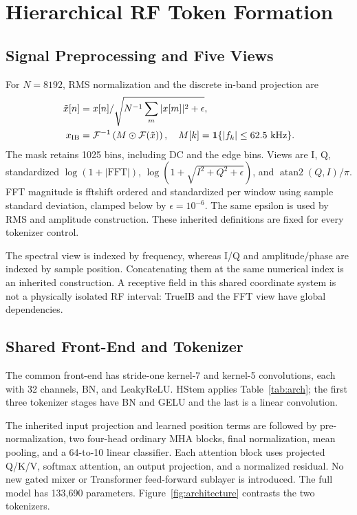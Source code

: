 \documentclass[journal]{IEEEtran}
\begin{document}
\section{Hierarchical RF Token Formation}
\subsection{Signal Preprocessing and Five Views}
For $N=8192$, RMS normalization and the discrete in-band projection are
\begin{align}
 \tilde{x}[n]&=x[n]/\sqrt{N^{-1}\sum_m|x[m]|^2+\epsilon},\\
 x_{\mathrm{IB}}&=\mathcal{F}^{-1}
      \left(M\odot\mathcal{F}(\tilde{x})\right),\quad
 M[k]=\mathbf{1}\{|f_k|\leq 62.5\ {\rm kHz}\}.
\end{align}
The mask retains 1025 bins, including DC and the edge bins. Views are I, Q, standardized $\log(1+|\mathrm{FFT}|)$, $\log(1+\sqrt{I^2+Q^2+\epsilon})$, and $\operatorname{atan2}(Q,I)/\pi$. FFT magnitude is fftshift ordered and standardized per window using sample standard deviation, clamped below by $\epsilon=10^{-6}$. The same epsilon is used by RMS and amplitude construction. These inherited definitions are fixed for every tokenizer control.

The spectral view is indexed by frequency, whereas I/Q and amplitude/phase are indexed by sample position. Concatenating them at the same numerical index is an inherited construction. A receptive field in this shared coordinate system is not a physically isolated RF interval: TrueIB and the FFT view have global dependencies.

\subsection{Shared Front-End and Tokenizer}
The common front-end has stride-one kernel-7 and kernel-5 convolutions, each with 32 channels, BN, and LeakyReLU. HStem applies Table~\ref{tab:arch}; the first three tokenizer stages have BN and GELU and the last is a linear convolution.



The inherited input projection and learned position terms are followed by pre-normalization, two four-head ordinary MHA blocks, final normalization, mean pooling, and a 64-to-10 linear classifier. Each attention block uses projected Q/K/V, softmax attention, an output projection, and a normalized residual. No new gated mixer or Transformer feed-forward sublayer is introduced. The full model has 133,690 parameters. Figure~\ref{fig:architecture} contrasts the two tokenizers.
\end{document}

